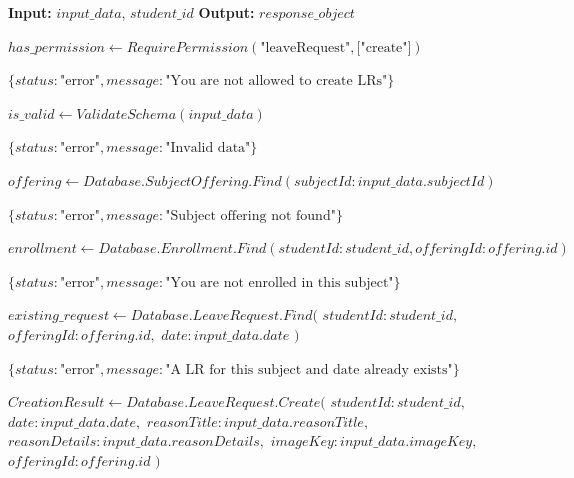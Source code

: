 \begin{algorithm}[H]
\caption{Submit LR Process}
\begin{algorithmic}[1]

\State \textbf{Input:} $input\_data$, $student\_id$
\State \textbf{Output:} $response\_object$


    \State {}
    \State $has\_permission \gets RequirePermission(\text{"leaveRequest"}, \text{["create"]})$

        \State \Return $\{status: \text{"error"}, message: \text{"You are not allowed to create LRs"}\}$
    \EndIf

    \State {}
    \State $is\_valid \gets ValidateSchema(input\_data)$

        \State \Return $\{status: \text{"error"}, message: \text{"Invalid data"}\}$
    \EndIf

    \State {}
    \State $offering \gets Database.SubjectOffering.Find(subjectId: input\_data.subjectId)$

        \State \Return $\{status: \text{"error"}, message: \text{"Subject offering not found"}\}$
    \EndIf

    \State {}
    \State $enrollment \gets Database.Enrollment.Find(studentId: student\_id, offeringId: offering.id)$

        \State \Return $\{status: \text{"error"}, message: \text{"You are not enrolled in this subject"}\}$
    \EndIf

    \State {}
    \State $existing\_request \gets Database.LeaveRequest.Find($
    \State \quad $studentId: student\_id,$
    \State \quad $offeringId: offering.id,$
    \State \quad $date: input\_data.date$
    \State $)$

        \State \Return $\{status: \text{"error"}, message: \text{"A LR for this subject and date already exists"}\}$
    \EndIf

    \State $CreationResult \gets Database.LeaveRequest.Create($
    \State \quad $studentId: student\_id,$
    \State \quad $date: input\_data.date,$
    \State \quad $reasonTitle: input\_data.reasonTitle,$
    \State \quad $reasonDetails: input\_data.reasonDetails,$
    \State \quad $imageKey: input\_data.imageKey,$
    \State \quad $offeringId: offering.id$
    \State $)$


\end{algorithmic}
\end{algorithm}
